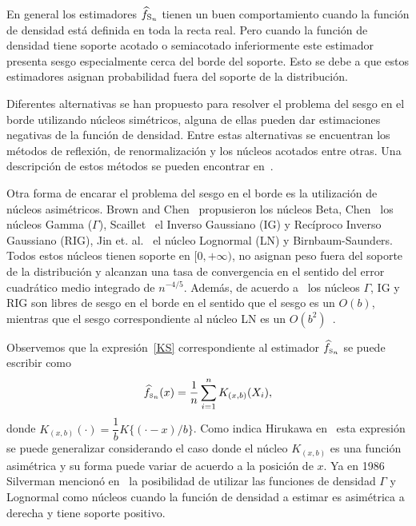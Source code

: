 En general los estimadores $\widehat{f}_{\tiny \text {S}_n}$ tienen un buen comportamiento cuando la función de densidad está definida en toda la recta real. Pero cuando la función de densidad tiene soporte acotado o semiacotado inferiormente este estimador presenta sesgo especialmente cerca del borde del soporte. Esto se debe a que estos estimadores asignan probabilidad fuera del soporte de la distribución.

Diferentes alternativas se han propuesto para resolver el problema del sesgo en el borde utilizando núcleos simétricos, alguna de ellas pueden dar estimaciones negativas de la función de densidad. Entre estas alternativas se encuentran los métodos de reflexión, de renormalización y los núcleos acotados entre otras. Una descripción de estos métodos se pueden encontrar en~\cite{Jones1993}.


Otra forma de encarar el problema del sesgo en el borde es la utilización de núcleos asimétricos. Brown and Chen~\cite{Brown1999,chen1999} propusieron los núcleos Beta, Chen~\cite{chensx2000} los núcleos Gamma ($\Gamma$), Scaillet~\cite{Scaillet2004} el Inverso Gaussiano (IG) y Recíproco Inverso Gaussiano (RIG), Jin et. al.~\cite{Jin2003} el núcleo Lognormal (LN) y Birnbaum-Saunders. Todos estos núcleos tienen soporte en $[0,+\infty)$, no asignan peso fuera del soporte de la distribución y alcanzan una tasa de convergencia en el sentido del error cuadrático medio integrado de $n^{-4/5}.$ Además, de acuerdo a~\cite{Scaillet2004}  los núcleos $\Gamma$, IG y RIG son libres de sesgo en el borde en el sentido que el sesgo es un $O(b)$, mientras que el sesgo correspondiente al núcleo LN es un $O(b^2)$~\cite{Libnegue2013}.

Observemos que la expresión~\ref{KS} correspondiente al estimador $\widehat{f}_{\text{\tiny S}_n}$ se puede escribir como
\begin{align}
\label{DefNucleosSim}
\widehat{f}_{\text{\tiny S}_n}(x)=\dfrac{1}{n} \sum_{i=1}^n K_{(x,b)} (X_i),
\end{align}
donde $K_{(x,b)}(\cdot) =\dfrac{1}{b} K\{(\cdot-x)/b\}$. Como indica Hirukawa en~\cite{Hirukawa2018} esta expresión se puede generalizar considerando el caso donde el núcleo $K_{(x,b)}$ es una función asimétrica y su forma puede variar de acuerdo a la posición de $x$. Ya en 1986 Silverman mencionó en~\cite{Silverman1986} la posibilidad de utilizar las funciones de densidad $\Gamma$ y Lognormal como núcleos cuando la función de densidad a estimar es asimétrica a derecha y tiene soporte positivo. 

